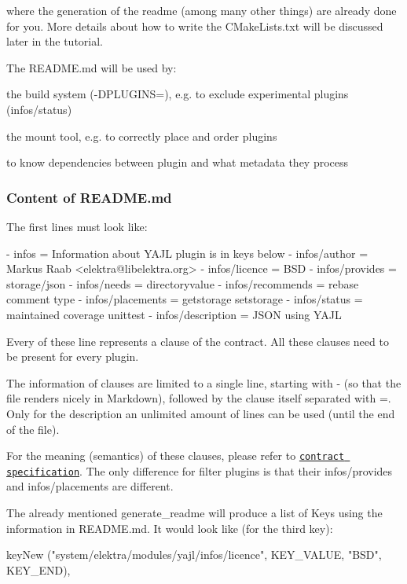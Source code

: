 where the generation of the readme (among many other things) are already done for you. More details about how to write the {\ttfamily C\+Make\+Lists.\+txt} will be discussed later in the tutorial.

The {\ttfamily R\+E\+A\+D\+M\+E.\+md} will be used by\+:


\begin{DoxyItemize}
\item the build system ({\ttfamily -\/\+D\+P\+L\+U\+G\+I\+NS=}), e.\+g. to exclude experimental plugins ({\ttfamily infos/status})
\item the mount tool, e.\+g. to correctly place and order plugins
\item to know dependencies between plugin and what metadata they process
\end{DoxyItemize}

\subsubsection*{Content of {\ttfamily R\+E\+A\+D\+M\+E.\+md}}

The first lines must look like\+:


\begin{DoxyCode}
- infos = Information about YAJL plugin is in keys below
- infos/author = Markus Raab <elektra@libelektra.org>
- infos/licence = BSD
- infos/provides = storage/json
- infos/needs = directoryvalue
- infos/recommends = rebase comment type
- infos/placements = getstorage setstorage
- infos/status = maintained coverage unittest
- infos/description = JSON using YAJL
\end{DoxyCode}


Every of these line represents a clause of the contract. All these clauses need to be present for every plugin.

The information of clauses are limited to a single line, starting with {\ttfamily -\/} (so that the file renders nicely in Markdown), followed by the clause itself separated with {\ttfamily =}. Only for the description an unlimited amount of lines can be used (until the end of the file).

For the meaning (semantics) of these clauses, please refer to \href{/home/markus/Projekte/Elektra/current/doc/CONTRACT.ini}{\tt contract specification}. The only difference for filter plugins is that their {\ttfamily infos/provides} and {\ttfamily infos/placements} are different.

The already mentioned {\ttfamily generate\+\_\+readme} will produce a list of Keys using the information in {\ttfamily R\+E\+A\+D\+M\+E.\+md}. It would look like (for the third key)\+: \begin{DoxyVerb}keyNew ("system/elektra/modules/yajl/infos/licence",
    KEY_VALUE, "BSD", KEY_END),
\end{DoxyVerb}


